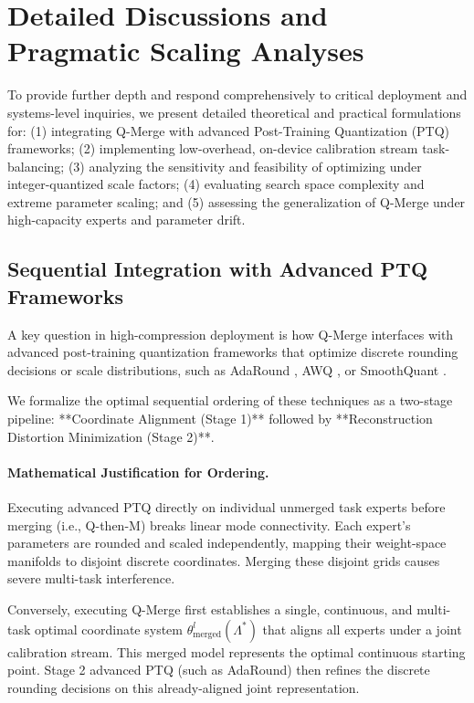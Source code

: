 \section{Detailed Discussions and Pragmatic Scaling Analyses}
\label{sec:appendix_discussions}

To provide further depth and respond comprehensively to critical deployment and systems-level inquiries, we present detailed theoretical and practical formulations for: (1) integrating Q-Merge with advanced Post-Training Quantization (PTQ) frameworks; (2) implementing low-overhead, on-device calibration stream task-balancing; (3) analyzing the sensitivity and feasibility of optimizing under integer-quantized scale factors; (4) evaluating search space complexity and extreme parameter scaling; and (5) assessing the generalization of Q-Merge under high-capacity experts and parameter drift.

\subsection{Sequential Integration with Advanced PTQ Frameworks}
\label{subsec:seq_ptq_integration}

A key question in high-compression deployment is how Q-Merge interfaces with advanced post-training quantization frameworks that optimize discrete rounding decisions or scale distributions, such as AdaRound \cite{nagel2020adaround}, AWQ \cite{lin2023awq}, or SmoothQuant \cite{xiao2023smoothquant}. 

We formalize the optimal sequential ordering of these techniques as a two-stage pipeline: **Coordinate Alignment (Stage 1)** followed by **Reconstruction Distortion Minimization (Stage 2)**. 

\paragraph{Mathematical Justification for Ordering.}
Executing advanced PTQ directly on individual unmerged task experts before merging (i.e., Q-then-M) breaks linear mode connectivity. Each expert's parameters are rounded and scaled independently, mapping their weight-space manifolds to disjoint discrete coordinates. Merging these disjoint grids causes severe multi-task interference. 

Conversely, executing Q-Merge first establishes a single, continuous, and multi-task optimal coordinate system $\theta^l_{\text{merged}}(\Lambda^*)$ that aligns all experts under a joint calibration stream. This merged model represents the optimal continuous starting point. Stage 2 advanced PTQ (such as AdaRound) then refines the discrete rounding decisions on this already-aligned joint representation.

